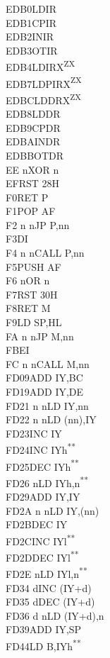 \documentclass[twoside,openright,a4paper]{book}
\newcommand{\UNDOC}{\textnormal{\textsuperscript{**}}}
\newcommand{\ZXN}{\textnormal{\textsuperscript{ZX}}}
\begin{document}
\begin{multicols}{3}
{\begin{tabbing}
	EDB0\>LDIR\\
	EDB1\>CPIR\\
	EDB2\>INIR\\
	EDB3\>OTIR\\
	EDB4\>LDIRX\ZXN\\
	EDB7\>LDPIRX\ZXN\\
	EDBC\>LDDRX\ZXN\\
	EDB8\>LDDR\\
	EDB9\>CPDR\\
	EDBA\>INDR\\
	EDBB\>OTDR\\
	EE n\>XOR n\\
	EF\>RST 28H\\
	F0\>RET P\\
	F1\>POP AF\\
	F2 n n\>JP P,nn\\
	F3\>DI\\
	F4 n n\>CALL P,nn\\
	F5\>PUSH AF\\
	F6 n\>OR n\\
	F7\>RST 30H\\
	F8\>RET M\\
	F9\>LD SP,HL\\
	FA n n\>JP M,nn\\
	FB\>EI\\
	FC n n\>CALL M,nn\\
	FD09\>ADD IY,BC\\
	FD19\>ADD IY,DE\\
	FD21 n n\>LD IY,nn\\
	FD22 n n\>LD (nn),IY\\
	FD23\>INC IY\\
	FD24\>INC IYh\UNDOC\\
	FD25\>DEC IYh\UNDOC\\
	FD26 n\>LD IYh,n\UNDOC\\
	FD29\>ADD IY,IY\\
	FD2A n n\>LD IY,(nn)\\
	FD2B\>DEC IY\\
	FD2C\>INC IYl\UNDOC\\
	FD2D\>DEC IYl\UNDOC\\
	FD2E n\>LD IYl,n\UNDOC\\
	FD34 d\>INC (IY+d)\\
	FD35 d\>DEC (IY+d)\\
	FD36 d n\>LD (IY+d),n\\
	FD39\>ADD IY,SP\\
	FD44\>LD B,IYh\UNDOC\\

\end{tabbing}}
\end{multicols}
\end{document}
